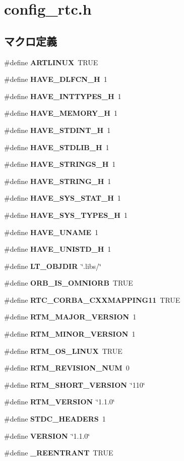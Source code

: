 \section{config\_\-rtc.h}
\label{config__rtc_8h}
\subsection*{マクロ定義}
\begin{DoxyCompactItemize}
\item 
\#define {\bf ARTLINUX}~TRUE
\item 
\#define {\bf HAVE\_\-DLFCN\_\-H}~1
\item 
\#define {\bf HAVE\_\-INTTYPES\_\-H}~1
\item 
\#define {\bf HAVE\_\-MEMORY\_\-H}~1
\item 
\#define {\bf HAVE\_\-STDINT\_\-H}~1
\item 
\#define {\bf HAVE\_\-STDLIB\_\-H}~1
\item 
\#define {\bf HAVE\_\-STRINGS\_\-H}~1
\item 
\#define {\bf HAVE\_\-STRING\_\-H}~1
\item 
\#define {\bf HAVE\_\-SYS\_\-STAT\_\-H}~1
\item 
\#define {\bf HAVE\_\-SYS\_\-TYPES\_\-H}~1
\item 
\#define {\bf HAVE\_\-UNAME}~1
\item 
\#define {\bf HAVE\_\-UNISTD\_\-H}~1
\item 
\#define {\bf LT\_\-OBJDIR}~\char`\"{}.libs/\char`\"{}
\item 
\#define {\bf ORB\_\-IS\_\-OMNIORB}~TRUE
\item 
\#define {\bf RTC\_\-CORBA\_\-CXXMAPPING11}~TRUE
\item 
\#define {\bf RTM\_\-MAJOR\_\-VERSION}~1
\item 
\#define {\bf RTM\_\-MINOR\_\-VERSION}~1
\item 
\#define {\bf RTM\_\-OS\_\-LINUX}~TRUE
\item 
\#define {\bf RTM\_\-REVISION\_\-NUM}~0
\item 
\#define {\bf RTM\_\-SHORT\_\-VERSION}~\char`\"{}110\char`\"{}
\item 
\#define {\bf RTM\_\-VERSION}~\char`\"{}1.1.0\char`\"{}
\item 
\#define {\bf STDC\_\-HEADERS}~1
\item 
\#define {\bf VERSION}~\char`\"{}1.1.0\char`\"{}
\item 
\#define {\bf \_\-REENTRANT}~TRUE
\end{DoxyCompactItemize}


